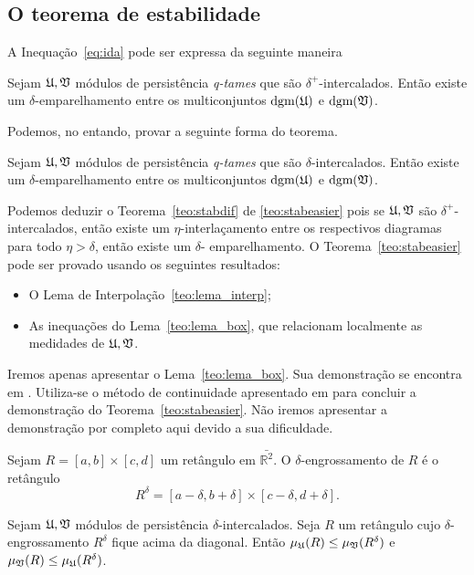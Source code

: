 \subsection{O teorema de estabilidade}
A Inequação~\ref{eq:ida} pode ser expressa da seguinte maneira
\begin{teo}\label{teo:stabdif}
    Sejam $\mathfrak{U}, \mathfrak{V}$ módulos de persistência \textit{q-tames} que são 
    $\delta^+$-intercalados. Então existe um $\delta$-emparelhamento entre os 
    multiconjuntos $\text{dgm}(\mathfrak{U})$ e $\text{dgm}(\mathfrak{V})$. 
\end{teo}

Podemos, no entando, provar a seguinte forma do teorema.
\begin{teo}\label{teo:stabeasier}
    Sejam $\mathfrak{U}, \mathfrak{V}$ módulos de persistência \textit{q-tames} que são 
    $\delta$-intercalados. Então existe um $\delta$-emparelhamento entre os 
    multiconjuntos $\text{dgm}(\mathfrak{U})$ e $\text{dgm}(\mathfrak{V})$. 
\end{teo}

Podemos deduzir o Teorema~\ref{teo:stabdif} de \ref{teo:stabeasier} pois se 
$\mathfrak{U}, \mathfrak{V}$ são $\delta^+$-intercalados, então existe um $\eta$-interlaçamento
entre os respectivos diagramas para todo $\eta > \delta$, então existe um $\delta$-
emparelhamento. O Teorema~\ref{teo:stabeasier} pode ser provado usando os seguintes
resultados:
\begin{itemize}
    \item O Lema de Interpolação~\ref{teo:lema_interp};
    \item As inequações do Lema~\ref{teo:lema_box}, que relacionam localmente
    as medidades de $\mathfrak{U}, \mathfrak{V}$. 
\end{itemize}
Iremos apenas apresentar o Lema~\ref{teo:lema_box}. Sua demonstração se 
encontra em \cite{Chazal2016}. Utiliza-se o método de continuidade apresentado
em \cite{CohenSteiner2006} para concluir a demonstração do Teorema~\ref{teo:stabeasier}.
Não iremos apresentar a demonstração por completo aqui devido a sua dificuldade. 

\begin{defi}
    Sejam $R = [a,b] \times [c,d]$ um retângulo em $\bar{\mathbb{R}^2}$. O 
    $\delta$-engrossamento de $R$ é o retângulo
    \begin{equation*}
        R^\delta = [a-\delta, b+\delta] \times [c-\delta, d + \delta].
    \end{equation*}
\end{defi}

\begin{lem}\label{teo:lema_box}
    Sejam $\mathfrak{U}, \mathfrak{V}$ módulos de persistência $\delta$-intercalados. Seja 
    $R$ um retângulo cujo $\delta$-engrossamento $R^\delta$ fique acima da diagonal.
    Então $\mu_{\mathfrak{U}}(R) \leq \mu_{\mathfrak{V}}(R^\delta)$ e $\mu_{\mathfrak{V}}(R) \leq \mu_{\mathfrak{U}}(R^\delta)$.
\end{lem}
